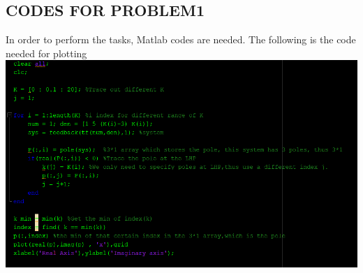 \documentclass[12pt]{article}
\begin{document}
\subsection{CODES FOR PROBLEM1}
In order to perform the tasks, Matlab codes are needed. The following is the code needed for plotting\\
\includegraphics[scale=0.6]{Code1.png} \\
\end{document}
